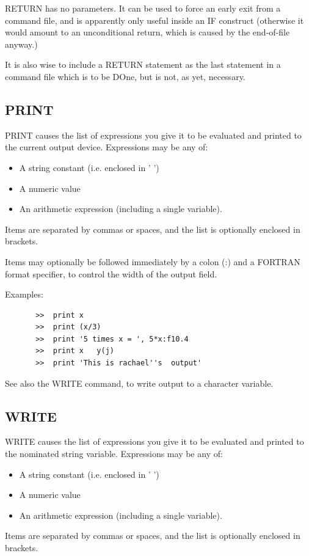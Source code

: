 \documentclass[11pt,twoside]{report}
\begin{document}
RETURN has no parameters. It can be used to force an early exit from a
command file, and is apparently only useful inside an IF construct (otherwise
it would amount to an unconditional return, which is caused by the end-of-file
anyway.)

It is also wise to include a RETURN statement as the last statement in a command
file which is to be DOne, but is not, as yet, necessary.

\subsection{PRINT}

PRINT causes the list of expressions you give it to be evaluated and printed to
the current output device. Expressions may be any of:
\begin{itemize}
\item    A string constant (i.e. enclosed in ' ')
\item    A numeric value
\item    An arithmetic expression (including a single variable).
\end{itemize}
Items are separated by commas or spaces, and the list is optionally enclosed
in brackets.

Items may optionally be followed immediately by a colon (:\index{:}) and a
FORTRAN format specifier, to control the width of the
output field. 

Examples:  
\begin{verbatim}
       >>  print x
       >>  print (x/3)
       >>  print '5 times x = ', 5*x:f10.4
       >>  print x   y(j)
       >>  print 'This is rachael''s  output'
\end{verbatim}

See also the WRITE command, to write output to a character variable.

\subsection{WRITE}

WRITE causes the list of expressions you give it to be evaluated and printed to
the nominated string variable. Expressions may be any of:
\begin{itemize}
\item    A string constant (i.e. enclosed in ' ')
\item    A numeric value
\item    An arithmetic expression (including a single variable).
\end{itemize}
Items are separated by commas or spaces, and the list is optionally enclosed
in brackets.
\end{document}
